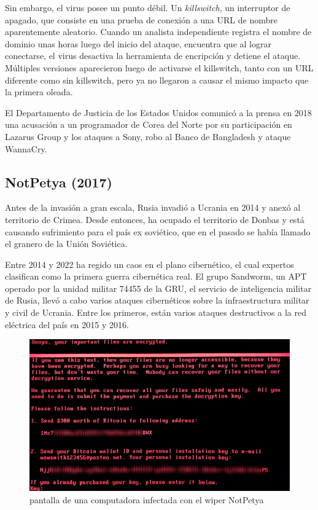\documentclass{article}
\begin{document}
Sin embargo, el virus posee un punto débil. Un {\it killswitch}, un interruptor de apagado, que consiste en una prueba de conexión a una URL de nombre aparentemente aleatorio. Cuando un analista independiente registra el nombre de dominio unas horas luego del inicio del ataque, encuentra que al lograr conectarse, el virus desactiva la herramienta de encripción y detiene el ataque. Múltiples versiones aparecieron luego de activarse el killswitch, tanto con un URL diferente como sin killswitch, pero ya no llegaron a causar el mismo impacto que la primera oleada. \autocite{darknetdiaries-wannacry}

El Departamento de Justicia de los Estados Unidos comunicó a la prensa en 2018 una acusación a un programador de Corea del Norte por su participación en Lazarus Group y los ataques a Sony, robo al Banco de Bangladesh y ataque WannaCry. \autocite{doj-lazarus}

\subsection{NotPetya (2017)}
Antes de la invasión a gran escala, Rusia invadió a Ucrania en 2014 y anexó al territorio de Crimea. Desde entonces, ha ocupado el territorio de Donbas y está causando sufrimiento para el país ex soviético, que en el pasado se había llamado el granero de la Unión Soviética.

Entre 2014 y 2022 ha regido un caos en el plano cibernético, el cual expertos clasifican como la primera guerra cibernética real. El grupo Sandworm, un APT operado por la unidad militar 74455 de la GRU, el servicio de inteligencia militar de Rusia, llevó a cabo varios ataques cibernéticos sobre la infraestructura militar y civil de Ucrania. Entre los primeros, están varios ataques destructivos a la red eléctrica del país en 2015 y 2016. \autocite{doj-sandworm}

\begin{figure}[t]
    \centering
    \includegraphics[width=1.0\textwidth]{notPetya.png}
    \caption{pantalla de una computadora infectada con el wiper NotPetya}
    \label{fig:notpetya}
\end{figure}
\end{document}
